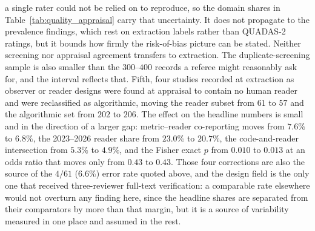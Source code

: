 \documentclass[review,authoryear]{elsarticle}
\begin{document}
a single rater could not be relied on to reproduce, so the domain shares in
Table~\ref{tab:quality_appraisal} carry that uncertainty. It does not propagate to the
prevalence findings, which rest on extraction labels rather than QUADAS-2 ratings, but it
bounds how firmly the risk-of-bias picture can be stated. Neither screening nor appraisal
agreement transfers to extraction. The duplicate-screening sample is also smaller than the
$300$--$400$ records a referee might reasonably ask for, and the interval reflects that.
Fifth, four studies recorded at extraction as observer or reader designs were found at
appraisal to contain no human reader and were reclassified as algorithmic, moving the
reader subset from $61$ to $57$ and the algorithmic set from $202$ to $206$. The effect on
the headline numbers is small and in the direction of a larger gap: metric--reader
co-reporting moves from $7.6\%$ to $6.8\%$, the 2023--2026 reader share from $23.0\%$ to
$20.7\%$, the code-and-reader intersection from $5.3\%$ to $4.9\%$, and the Fisher exact
$p$ from $0.010$ to $0.013$ at an odds ratio that moves only from $0.43$ to $0.43$. Those
four corrections are also the source of the $4/61$ ($6.6\%$) error rate quoted above, and
the design field is the only one that received three-reviewer full-text verification: a
comparable rate elsewhere would not overturn any finding here, since the headline shares
are separated from their comparators by more than that margin, but it is a source of
variability measured in one place and assumed in the rest.
\end{document}
